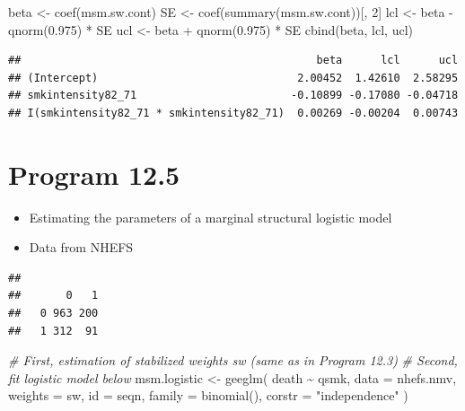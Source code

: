 \documentclass[
  10pt,
]{book}
\newenvironment{Shaded}{\begin{snugshade}}{\end{snugshade}}
\newcommand{\AttributeTok}[1]{\textcolor[rgb]{0.77,0.63,0.00}{#1}}
\newcommand{\CommentTok}[1]{\textcolor[rgb]{0.56,0.35,0.01}{\textit{#1}}}
\newcommand{\DecValTok}[1]{\textcolor[rgb]{0.00,0.00,0.81}{#1}}
\newcommand{\FloatTok}[1]{\textcolor[rgb]{0.00,0.00,0.81}{#1}}
\newcommand{\FunctionTok}[1]{\textcolor[rgb]{0.00,0.00,0.00}{#1}}
\newcommand{\NormalTok}[1]{#1}
\newcommand{\OtherTok}[1]{\textcolor[rgb]{0.56,0.35,0.01}{#1}}
\newcommand{\SpecialCharTok}[1]{\textcolor[rgb]{0.00,0.00,0.00}{#1}}
\newcommand{\StringTok}[1]{\textcolor[rgb]{0.31,0.60,0.02}{#1}}
\providecommand{\tightlist}{%
  \setlength{\itemsep}{0pt}\setlength{\parskip}{0pt}}
\begin{document}
\begin{Shaded}
\begin{Highlighting}[]
\NormalTok{beta }\OtherTok{\textless{}{-}} \FunctionTok{coef}\NormalTok{(msm.sw.cont)}
\NormalTok{SE }\OtherTok{\textless{}{-}} \FunctionTok{coef}\NormalTok{(}\FunctionTok{summary}\NormalTok{(msm.sw.cont))[, }\DecValTok{2}\NormalTok{]}
\NormalTok{lcl }\OtherTok{\textless{}{-}}\NormalTok{ beta }\SpecialCharTok{{-}} \FunctionTok{qnorm}\NormalTok{(}\FloatTok{0.975}\NormalTok{) }\SpecialCharTok{*}\NormalTok{ SE}
\NormalTok{ucl }\OtherTok{\textless{}{-}}\NormalTok{ beta }\SpecialCharTok{+} \FunctionTok{qnorm}\NormalTok{(}\FloatTok{0.975}\NormalTok{) }\SpecialCharTok{*}\NormalTok{ SE}
\FunctionTok{cbind}\NormalTok{(beta, lcl, ucl)}
\end{Highlighting}
\end{Shaded}

\begin{verbatim}
##                                              beta      lcl      ucl
## (Intercept)                               2.00452  1.42610  2.58295
## smkintensity82_71                        -0.10899 -0.17080 -0.04718
## I(smkintensity82_71 * smkintensity82_71)  0.00269 -0.00204  0.00743
\end{verbatim}

\hypertarget{program-12.5}{%
\section{Program 12.5}\label{program-12.5}}

\begin{itemize}
\tightlist
\item
  Estimating the parameters of a marginal structural logistic model
\item
  Data from NHEFS
\end{itemize}

\begin{Shaded}
\end{Shaded}

\begin{verbatim}
##    
##       0   1
##   0 963 200
##   1 312  91
\end{verbatim}

\begin{Shaded}
\begin{Highlighting}[]
\CommentTok{\# First, estimation of stabilized weights sw (same as in Program 12.3)}
\CommentTok{\# Second, fit logistic model below}
\NormalTok{msm.logistic }\OtherTok{\textless{}{-}} \FunctionTok{geeglm}\NormalTok{(}
\NormalTok{  death }\SpecialCharTok{\textasciitilde{}}\NormalTok{ qsmk,}
  \AttributeTok{data =}\NormalTok{ nhefs.nmv,}
  \AttributeTok{weights =}\NormalTok{ sw,}
  \AttributeTok{id =}\NormalTok{ seqn,}
  \AttributeTok{family =} \FunctionTok{binomial}\NormalTok{(),}
  \AttributeTok{corstr =} \StringTok{"independence"}
\NormalTok{)}
\end{Highlighting}
\end{Shaded}
\end{document}
